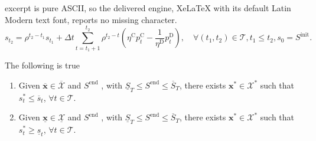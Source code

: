 \documentclass[10pt,a4paper]{amsart}
\newcommand{\up}[1]{^{\mathrm{#1}}}
\begin{document}
excerpt is pure ASCII, so the delivered engine, XeLaTeX with its default Latin Modern text font, reports no missing character.
\begin{equation} \label{eq:s_calc}
    s_{t_2} = \rho^{t_2 - t_1} s_{t_1} + \Delta t\sum_{t=t_1+1}^{t_2} \rho^{t_2 - t} \left( \eta\up{C} p_t\up{C} - \frac{1}{\eta\up{D}} p_t\up{D} \right), \quad \forall (t_1,t_2) \in \mathcal{T}, t_1 \leq t_2, s_0 = S\up{init}.
\end{equation}

\begin{lemma} \label{lemma1}
    The following is true
    \begin{enumerate}
        \item Given $\mathbf{\overline{x}} \in \overline{\mathcal{X}}$ and $S\up{end}$ , with $\underline{S}_T \leq S\up{end} \leq \overline{S}_T$, there exists $\mathbf{x}^* \in \mathcal{X}^*$ such that ${s}_t^* \leq \overline{s}_t$, $\forall t \in \mathcal{T}$.
        \item Given $\mathbf{\underline{x}} \in \underline{\mathcal{X}}$ and $S\up{end}$ , with $\underline{S}_T \leq S\up{end} \leq \overline{S}_T$, there exists $\mathbf{x}^* \in \mathcal{X}^*$ such that ${s}_t^* \geq \underline{s}_t$, $\forall t \in \mathcal{T}$.
    \end{enumerate}
\end{lemma}
\end{document}
